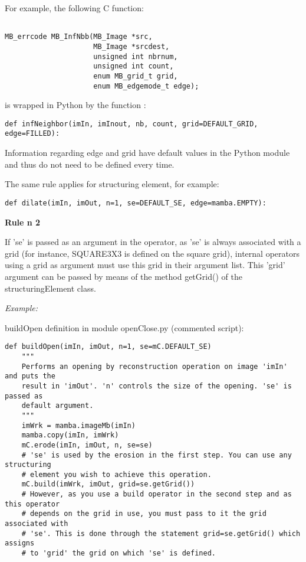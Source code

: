 \documentclass[a4paper,10pt,oneside]{article}
\begin{document}
For example, the following C function:
\lstset{language=C} 
\begin{lstlisting} 

MB_errcode MB_InfNbb(MB_Image *src,
                     MB_Image *srcdest,
                     unsigned int nbrnum,
                     unsigned int count,
                     enum MB_grid_t grid,
                     enum MB_edgemode_t edge);
\end{lstlisting}
is wrapped in Python by the function :
\lstset{language=Python}
\begin{lstlisting} 
def infNeighbor(imIn, imInout, nb, count, grid=DEFAULT_GRID, edge=FILLED):
\end{lstlisting}

Information regarding edge and grid have default values in the Python module 
and thus do not need to be defined every time.

The same rule applies for structuring element, for example:
\begin{lstlisting} 
def dilate(imIn, imOut, n=1, se=DEFAULT_SE, edge=mamba.EMPTY):
\end{lstlisting}

\textbf{Rule n\textdegree{} 2}

If 'se' is passed as an argument in the operator, as 'se' is always associated
with a grid (for instance, SQUARE3X3 is defined on the square grid), internal
operators using a grid as argument must use this grid in their argument list. 
This 'grid' argument can be passed by means of the method getGrid() of the 
structuringElement class.\par

\emph{Example:}

buildOpen definition in module openClose.py (commented script):

\lstset{language=Python}
\begin{lstlisting}
def buildOpen(imIn, imOut, n=1, se=mC.DEFAULT_SE)
    """
    Performs an opening by reconstruction operation on image 'imIn' and puts the
    result in 'imOut'. 'n' controls the size of the opening. 'se' is passed as 
    default argument.
    """
    imWrk = mamba.imageMb(imIn)
    mamba.copy(imIn, imWrk)
    mC.erode(imIn, imOut, n, se=se)
    # 'se' is used by the erosion in the first step. You can use any structuring
    # element you wish to achieve this operation.
    mC.build(imWrk, imOut, grid=se.getGrid())
    # However, as you use a build operator in the second step and as this operator
    # depends on the grid in use, you must pass to it the grid associated with 
    # 'se'. This is done through the statement grid=se.getGrid() which assigns
    # to 'grid' the grid on which 'se' is defined.
\end{lstlisting}
\end{document}
